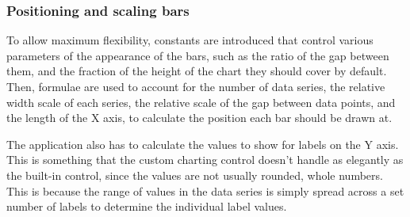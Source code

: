 	\subsubsection{Positioning and scaling bars}
	To allow maximum flexibility, constants are introduced that control various parameters of the appearance of the bars, such as the ratio of the gap between them, and the fraction of the height of the chart they should cover by default. Then, formulae are used to account for the number of data series, the relative width scale of each series, the relative scale of the gap between data points, and the length of the X axis, to calculate the position each bar should be drawn at.
	
	The application also has to calculate the values to show for labels on the Y axis. This is something that the custom charting control doesn't handle as elegantly as the built-in control, since the values are not usually rounded, whole numbers. This is because the range of values in the data series is simply spread across a set number of labels to determine the individual label values.
